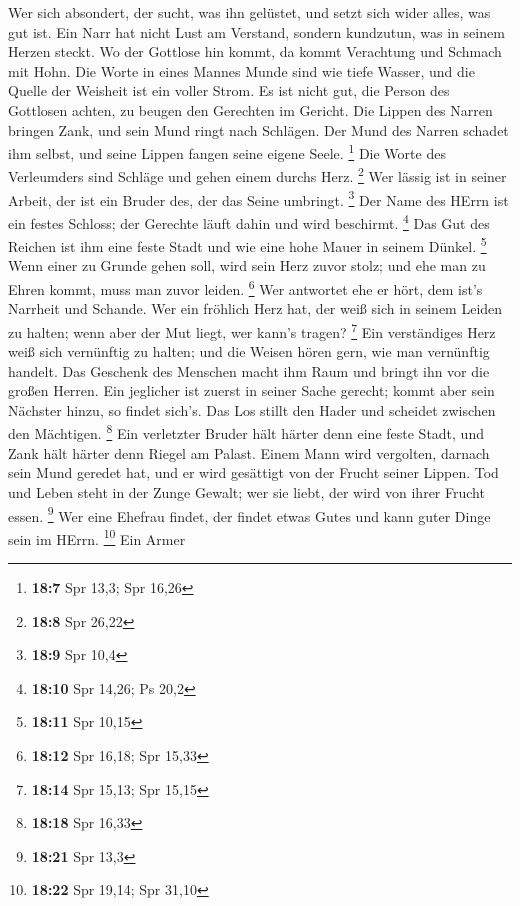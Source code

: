  Wer sich absondert, der sucht, was ihn gelüstet, und setzt
sich wider alles, was gut ist.  Ein Narr hat nicht Lust am
Verstand, sondern kundzutun, was in seinem Herzen steckt. 
Wo der Gottlose hin kommt, da kommt Verachtung und Schmach mit Hohn.
 Die Worte in eines Mannes Munde sind wie tiefe Wasser, und
die Quelle der Weisheit ist ein voller Strom.  Es ist nicht
gut, die Person des Gottlosen achten, zu beugen den Gerechten im
Gericht.  Die Lippen des Narren bringen Zank, und sein Mund
ringt nach Schlägen.  Der Mund des Narren schadet ihm
selbst, und seine Lippen fangen seine eigene Seele. \footnote{\textbf{18:7}
  Spr 13,3; Spr 16,26}  Die Worte des Verleumders sind
Schläge und gehen einem durchs Herz. \footnote{\textbf{18:8} Spr 26,22}
 Wer lässig ist in seiner Arbeit, der ist ein Bruder des,
der das Seine umbringt. \footnote{\textbf{18:9} Spr 10,4} 
Der Name des HErrn ist ein festes Schloss; der Gerechte läuft dahin und
wird beschirmt. \footnote{\textbf{18:10} Spr 14,26; Ps 20,2}
 Das Gut des Reichen ist ihm eine feste Stadt und wie eine
hohe Mauer in seinem Dünkel. \footnote{\textbf{18:11} Spr 10,15}
 Wenn einer zu Grunde gehen soll, wird sein Herz zuvor
stolz; und ehe man zu Ehren kommt, muss man zuvor leiden. \footnote{\textbf{18:12}
  Spr 16,18; Spr 15,33}  Wer antwortet ehe er hört, dem
ist's Narrheit und Schande.  Wer ein fröhlich Herz hat, der
weiß sich in seinem Leiden zu halten; wenn aber der Mut liegt, wer
kann's tragen? \footnote{\textbf{18:14} Spr 15,13; Spr 15,15}
 Ein verständiges Herz weiß sich vernünftig zu halten; und
die Weisen hören gern, wie man vernünftig handelt.  Das
Geschenk des Menschen macht ihm Raum und bringt ihn vor die großen
Herren.  Ein jeglicher ist zuerst in seiner Sache gerecht;
kommt aber sein Nächster hinzu, so findet sich's.  Das Los
stillt den Hader und scheidet zwischen den Mächtigen. \footnote{\textbf{18:18}
  Spr 16,33}  Ein verletzter Bruder hält härter denn eine
feste Stadt, und Zank hält härter denn Riegel am Palast. 
Einem Mann wird vergolten, darnach sein Mund geredet hat, und er wird
gesättigt von der Frucht seiner Lippen.  Tod und Leben
steht in der Zunge Gewalt; wer sie liebt, der wird von ihrer Frucht
essen. \footnote{\textbf{18:21} Spr 13,3}  Wer eine Ehefrau
findet, der findet etwas Gutes und kann guter Dinge sein im HErrn.
\footnote{\textbf{18:22} Spr 19,14; Spr 31,10}  Ein Armer
